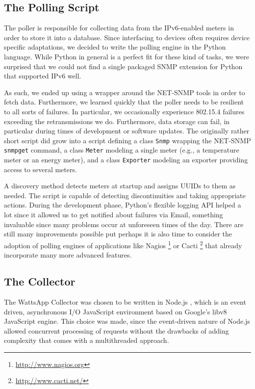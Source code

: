 \documentclass[10pt, conference, compsocconf, english]{IEEEtran}
\begin{document}
\subsection{The Polling Script}

The poller is responsible for collecting data from the IPv6-enabled
meters in order to store it into a database. Since interfacing to
devices often requires device specific adaptations, we decided to
write the polling engine in the Python language. While Python in general
is a perfect fit for these kind of tasks, we were surprised that we
could not find a single packaged SNMP extension for Python that supported
IPv6 well.

As such, we ended up using a wrapper around the NET-SNMP tools in
order to fetch data. Furthermore, we learned quickly that the poller
needs to be resilient to all sorts of failures. In particular, we
occasionally experience 802.15.4 failures exceeding the retransmissions
we do. Furthermore, data storage can fail, in particular during times
of development or software updates. The originally rather short script
did grow into a script defining a class \texttt{Snmp} wrapping the
NET-SNMP \texttt{snmpget} command, a class \texttt{Meter} modeling
a single meter (e.g., a temperature meter or an energy meter), and
a class \texttt{Exporter} modeling an exporter providing access to
several meters.

A discovery method detects meters at startup and assigns UUIDs to
them as needed. The script is capable of detecting discontinuities
and taking appropriate actions. During the development phase, Python's
flexible logging API helped a lot since it allowed us to get notified
about failures via Email, something invaluable since many problems
occur at unforeseen times of the day. There are still many improvements
possible put perhaps it is also time to consider the adoption of
polling engines of applications like Nagios%
\footnote{\url{http://www.nagios.org}%
} or Cacti%
\footnote{\url{http://www.cacti.net/}%
} that already incorporate many more advanced features.


\subsection{The Collector}

The WattsApp Collector was chosen to be written in Node.js \cite{nodejs:2010},
which is an event driven, asynchronous I/O JavaScript environment
based on Google's libv8 JavaScript engine. This choice was made, since
the event-driven nature of Node.js allowed concurrent processing of
requests without the drawbacks of adding complexity that comes with
a multithreaded approach.
\end{document}
